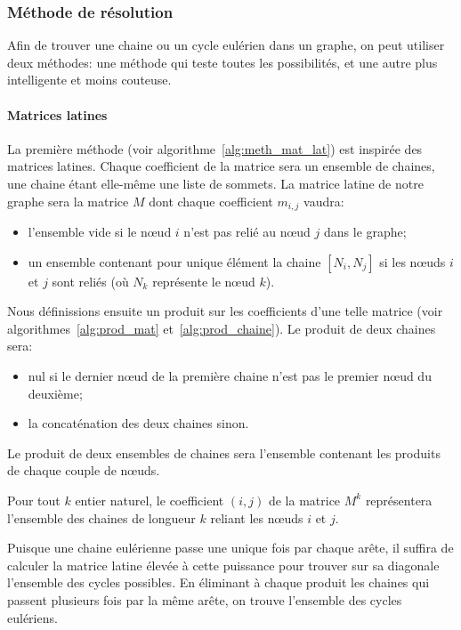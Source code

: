   \subsubsection{Méthode de résolution}
    Afin de trouver une chaine ou un cycle eulérien dans un graphe, on peut
    utiliser deux méthodes: une méthode qui teste toutes les possibilités, et
    une autre plus intelligente et moins couteuse.

    \paragraph{Matrices latines}
      La première méthode (voir algorithme~\ref{alg:meth_mat_lat}) est inspirée
      des matrices latines. Chaque coefficient de la matrice sera un ensemble
      de chaines, une chaine étant elle-même une liste de sommets. La matrice
      latine de notre graphe sera la matrice $M$ dont chaque coefficient
      $m_{i,j}$ vaudra:
      \begin{itemize}
        \item l'ensemble vide si le nœud $i$ n'est pas relié au nœud $j$ dans
          le graphe;
        \item un ensemble contenant pour unique élément la chaine  $[N_i,N_j]$
          si les nœuds $i$ et $j$ sont reliés (où $N_k$ représente le nœud
          $k$).
      \end{itemize}

      Nous définissions ensuite un produit sur les coefficients d'une telle
      matrice (voir algorithmes~\ref{alg:prod_mat} et~\ref{alg:prod_chaine}). Le
      produit de deux chaines sera:
      \begin{itemize}
        \item nul si le dernier nœud de la première chaine n'est pas le premier
          nœud du deuxième;
        \item la concaténation des deux chaines sinon.
      \end{itemize}

      Le produit de deux ensembles de chaines sera l'ensemble contenant les
      produits de chaque couple de nœuds.

      Pour tout $k$ entier naturel, le coefficient $(i,j)$ de la matrice $M^k$
      représentera l'ensemble des chaines de longueur $k$ reliant les nœuds $i$
      et $j$.

      Puisque une chaine eulérienne passe une unique fois par chaque arête, il
      suffira de calculer la matrice latine élevée à cette puissance pour
      trouver sur sa diagonale l'ensemble des cycles possibles. En éliminant à
      chaque produit les chaines qui passent plusieurs fois par la même arête,
      on trouve l'ensemble des cycles eulériens.

